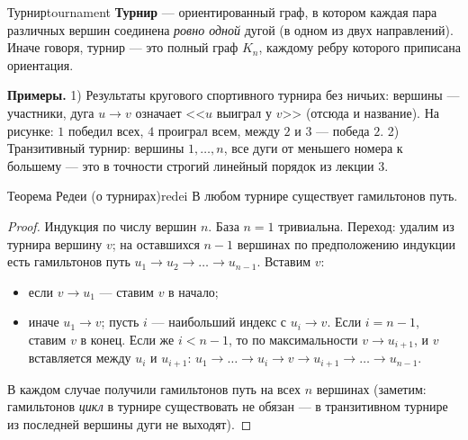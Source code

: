 \begin{defn}{Турнир}{tournament}
\textbf{Турнир} --- ориентированный граф, в котором каждая пара
различных вершин соединена \emph{ровно одной} дугой (в одном из двух
направлений). Иначе говоря, турнир --- это полный граф $K_n$, каждому
ребру которого приписана ориентация.
\end{defn}


\textbf{Примеры.} 1) Результаты кругового спортивного турнира без
ничьих: вершины --- участники, дуга $u \to v$ означает <<$u$ выиграл у
$v$>> (отсюда и название). На рисунке: $1$ победил всех, $4$ проиграл
всем, между $2$ и $3$ --- победа $2$. 2) Транзитивный турнир: вершины
$1, \ldots, n$, все дуги от меньшего номера к большему --- это в
точности строгий линейный порядок из лекции 3.

\begin{statement}{Теорема Редеи (о турнирах)}{redei}
В любом турнире существует гамильтонов путь.
\end{statement}

\begin{proof}
Индукция по числу вершин $n$. База $n = 1$ тривиальна. Переход: удалим
из турнира вершину $v$; на оставшихся $n - 1$ вершинах по предположению
индукции есть гамильтонов путь $u_1 \to u_2 \to \ldots \to u_{n-1}$.
Вставим $v$:
\begin{itemize}
  \item если $v \to u_1$ --- ставим $v$ в начало;
  \item иначе $u_1 \to v$; пусть $i$ --- наибольший индекс с
        $u_i \to v$. Если $i = n - 1$, ставим $v$ в конец. Если же
        $i < n - 1$, то по максимальности $v \to u_{i+1}$, и $v$
        вставляется между $u_i$ и $u_{i+1}$:
        $u_1 \to \ldots \to u_i \to v \to u_{i+1} \to \ldots \to u_{n-1}$.
\end{itemize}
В каждом случае получили гамильтонов путь на всех $n$ вершинах
(заметим: гамильтонов \emph{цикл} в турнире существовать не обязан ---
в транзитивном турнире из последней вершины дуги не выходят).
\end{proof}


